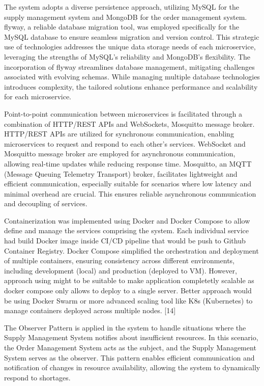 \documentclass[conference]{IEEEtran}
\begin{document}
The system adopts a diverse persistence approach, utilizing MySQL for the supply management system and MongoDB for the order management system. flyway, a reliable database migration tool, was employed specifically for the MySQL database to ensure seamless migration and version control. This strategic use of technologies addresses the unique data storage needs of each microservice, leveraging the strengths of MySQL's reliability and MongoDB's flexibility. The incorporation of flyway streamlines database management, mitigating challenges associated with evolving schemas. While managing multiple database technologies introduces complexity, the tailored solutions enhance performance and scalability for each microservice.

Point-to-point communication between microservices is facilitated through a combination of HTTP/REST APIs and WebSockets, Mosquitto message broker. HTTP/REST APIs are utilized for synchronous communication, enabling microservices to request and respond to each other's services. WebSocket and Mosquitto message broker are employed for asynchronous communication, allowing real-time updates while reducing response time. Mosquitto, an MQTT (Message Queuing Telemetry Transport) broker, facilitates lightweight and efficient communication, especially suitable for scenarios where low latency and minimal overhead are crucial. This ensures reliable asynchronous communication and decoupling of services.

Containerization was implemented using Docker and Docker Compose to allow define and manage the services comprising the system. Each individual service had build Docker image inside CI/CD pipeline that would be push to Github Container Registry. Docker Compose simplified the orchestration and deployment of multiple containers, ensuring consistency across different environments, including development (local) and production (deployed to VM). However, approach using might to be suitable to make application completetly scalable as docker compose only allows to deploy to a single server. Better approach would be using Docker Swarm or more advanced scaling tool like K8s (Kubernetes) to manage containers deployed across multiple nodes. [14]

The Observer Pattern is applied in the system to handle situations where the Supply Management System notifies about insufficient resources. In this scenario, the Order Management System acts as the subject, and the Supply Management System serves as the observer. This pattern enables efficient communication and notification of changes in resource availability, allowing the system to dynamically respond to shortages. 
 
\end{document}
